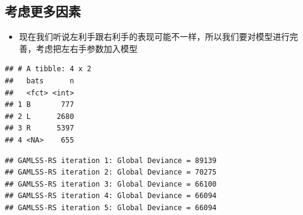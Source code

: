 \documentclass[]{book}
\newenvironment{Shaded}{\begin{snugshade}}{\end{snugshade}}
\newcommand{\CommentTok}[1]{\textcolor[rgb]{0.56,0.35,0.01}{\textit{#1}}}
\newcommand{\DataTypeTok}[1]{\textcolor[rgb]{0.13,0.29,0.53}{#1}}
\newcommand{\KeywordTok}[1]{\textcolor[rgb]{0.13,0.29,0.53}{\textbf{#1}}}
\newcommand{\NormalTok}[1]{#1}
\newcommand{\OperatorTok}[1]{\textcolor[rgb]{0.81,0.36,0.00}{\textbf{#1}}}
\newcommand{\StringTok}[1]{\textcolor[rgb]{0.31,0.60,0.02}{#1}}
\providecommand{\tightlist}{%
  \setlength{\itemsep}{0pt}\setlength{\parskip}{0pt}}
\begin{document}
\subsection{考虑更多因素}

\begin{itemize}
\tightlist
\item
  现在我们听说左利手跟右利手的表现可能不一样，所以我们要对模型进行完善，考虑把左右手参数加入模型
\end{itemize}

\begin{Shaded}
\end{Shaded}

\begin{verbatim}
## # A tibble: 4 x 2
##   bats      n
##   <fct> <int>
## 1 B       777
## 2 L      2680
## 3 R      5397
## 4 <NA>    655
\end{verbatim}

\begin{Shaded}
\end{Shaded}

\begin{verbatim}
## GAMLSS-RS iteration 1: Global Deviance = 89139 
## GAMLSS-RS iteration 2: Global Deviance = 70275 
## GAMLSS-RS iteration 3: Global Deviance = 66100 
## GAMLSS-RS iteration 4: Global Deviance = 66094 
## GAMLSS-RS iteration 5: Global Deviance = 66094
\end{verbatim}
\end{document}
